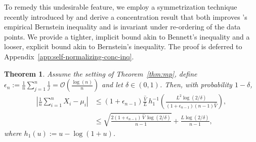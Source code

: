 \documentclass[aos]{imsart2}
\theoremstyle{plain}
\newtheorem{theorem}{Theorem}[section]
\theoremstyle{definition}
\newcommand{\E}{\mathbb{E}}
\newcommand{\mub}{\bar{\mu}}
\newcommand{\xb}{\bar{X}}
\newcommand{\vh}{\hat{V}}
\newcommand{\tf}[1]{\textcolor{red}{[TF: #1]}}
\begin{document}
To remedy this undesirable feature, we employ a symmetrization technique recently introduced by \citet{barber_hoeffding_2024} and derive a concentration result that both improves \citet{maurer_empirical_2009}'s empirical Bernstein inequality and is invariant under re-ordering of the data points. We provide a tighter, implicit bound akin to Bennett's inequality and a looser, explicit bound akin to Bernstein's inequality. The proof is deferred to Appendix~\ref{app:self-normalizing-conc-inq}.
\begin{theorem}\label{thm:mine-bernstein}
    Assume the setting of Theorem~\ref{thm:mp}, define $\epsilon_n := \frac{1}{n} \sum_{j=1}^{n} \frac{1}{j} =\mathcal{O}(\frac{\log(n)}{n})$ and let $\delta \in (0,1)$. Then, with probability $1-\delta$,
    \begin{align*}
        \left\vert\frac{1}{n}\sum_{i=1}^n X_i - \mu_i\right\vert 
        &\leq (1+\epsilon_{n-1})\frac{\vh}{L}\, h_1^{-1}\!\left(\frac{L^2\log(2/\delta)}{(1+\epsilon_{n-1})(n-1)\vh}\right),\\
        &\leq\sqrt{\frac{2(1+\epsilon_{n-1})\,\vh \,\log(2/\delta)}{n-1}} + \frac{L\log(2/\delta)}{n-1},
    \end{align*}
    where $h_1(u) := u - \log(1+u)$.
\end{theorem}
\end{document}
